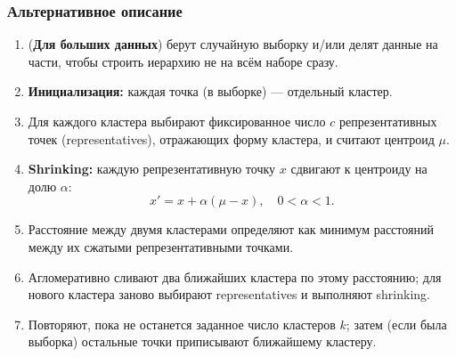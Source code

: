 \documentclass[11pt]{article}
\begin{document}
\subsubsection{Альтернативное описание}

\begin{enumerate}
    \item (\textbf{Для больших данных}) берут случайную выборку и/или делят данные на части, чтобы строить иерархию не на всём наборе сразу.
    
    \item \textbf{Инициализация:} каждая точка (в выборке) — отдельный кластер.
    
    \item Для каждого кластера выбирают фиксированное число $c$ репрезентативных точек (representatives), отражающих форму кластера, и считают центроид $\mu$.
    
    \item \textbf{Shrinking:} каждую репрезентативную точку $x$ сдвигают к центроиду на долю $\alpha$:
    \[
    x' = x + \alpha(\mu - x), \quad 0 < \alpha < 1.
    \]
    
    \item Расстояние между двумя кластерами определяют как минимум расстояний между их сжатыми репрезентативными точками.
    
    \item Агломеративно сливают два ближайших кластера по этому расстоянию; для нового кластера заново выбирают representatives и выполняют shrinking.
    
    \item Повторяют, пока не останется заданное число кластеров $k$; затем (если была выборка) остальные точки приписывают ближайшему кластеру.
\end{enumerate}
\end{document}
